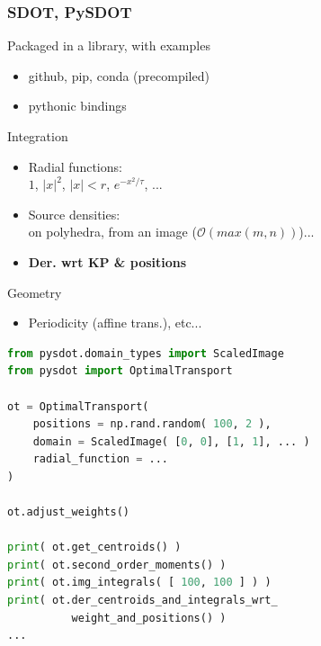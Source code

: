 \documentclass[aspectratio=169]{beamer}
\begin{document}
\begin{frame}[fragile]
    \frametitle{SDOT, PySDOT}

    \begin{minipage}[c][0.8\textheight][c]{0.44\textwidth}
        Packaged in a library, with examples
        \begin{itemize}
            \item github, pip, conda (precompiled)
            \item pythonic bindings
        \end{itemize}
    
        \vfill        
        Integration
        \begin{itemize}
            \item Radial functions: \\ $1$, $|x|^2$, $|x| < r$, $e^{-x^2 / \tau}$, ...
            \item Source densities: \\ on polyhedra, from an image ($\mathcal{O}( max( m, n ) )$)...
            \item \textbf{Der. wrt KP \& positions}
        \end{itemize}
    
        \vfill
        Geometry
        \begin{itemize}
            \item Periodicity (affine trans.), etc...
        \end{itemize}
    \end{minipage}
    \begin{minipage}[c][0.8\textheight][c]{0.55\textwidth}
        \begin{scriptsize}
            \begin{lstlisting}[language=Python]
from pysdot.domain_types import ScaledImage
from pysdot import OptimalTransport

ot = OptimalTransport(
    positions = np.rand.random( 100, 2 ),
    domain = ScaledImage( [0, 0], [1, 1], ... )
    radial_function = ...
)

ot.adjust_weights()

print( ot.get_centroids() )
print( ot.second_order_moments() )
print( ot.img_integrals( [ 100, 100 ] ) )
print( ot.der_centroids_and_integrals_wrt_
          weight_and_positions() )
...
            \end{lstlisting}
        \end{scriptsize}
    \end{minipage}
\end{frame}
\end{document}
